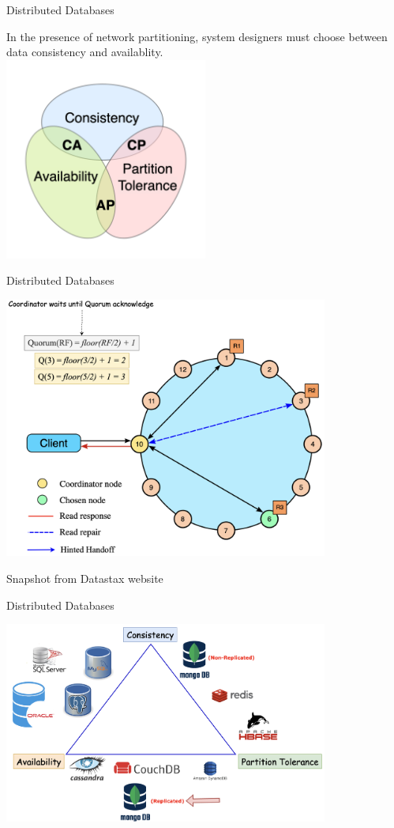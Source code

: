 \documentclass{beamer}
\begin{document}
\begin{frame}{Distributed Databases}
  \begin{center}
    In the presence of network partitioning, system designers must choose between data consistency and availablity. \\
    \includegraphics[width=0.5\textwidth]{img/CAP_Theorem_Venn_Diagram.png}
  \end{center}
\end{frame}


\begin{frame}{Distributed Databases}
  \begin{center}
    \includegraphics[width=0.8\textwidth]{img/Q-scenario.png}
  \end{center}
  
  Snapshot from Datastax website
\end{frame}


\begin{frame}{Distributed Databases}
  \begin{center}
    \includegraphics[width=0.8\textwidth]{img/db-cap-theorem.png}
  \end{center}
\end{frame}
\end{document}
